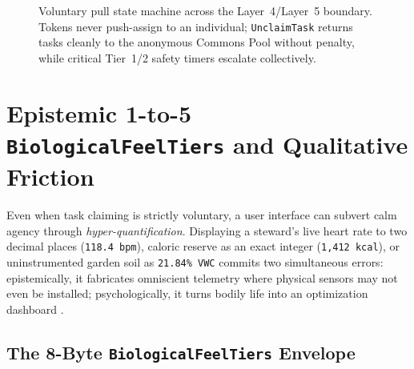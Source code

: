 \begin{figure}[htbp]
{%
}
\caption{Voluntary pull state machine across the Layer~4/Layer~5 boundary. Tokens never push-assign to an individual; \texttt{UnclaimTask} returns tasks cleanly to the anonymous Commons Pool without penalty, while critical Tier~1/2 safety timers escalate collectively.}
\label{fig:voluntary-pull-fsm}
\end{figure}

\section{Epistemic 1-to-5 \texttt{BiologicalFeelTiers} and Qualitative Friction}
\label{sec:epistemic-feel-tiers}

Even when task claiming is strictly voluntary, a user interface can subvert calm agency through \emph{hyper-quantification}. Displaying a steward's live heart rate to two decimal places (\texttt{118.4 bpm}), caloric reserve as an exact integer (\texttt{1,412 kcal}), or uninstrumented garden soil as \texttt{21.84\% VWC} commits two simultaneous errors: epistemically, it fabricates omniscient telemetry where physical sensors may not even be installed; psychologically, it turns bodily life into an optimization dashboard \parencite{han2015,weiser1996calm}.

\subsection{The 8-Byte \texttt{BiologicalFeelTiers} Envelope}

